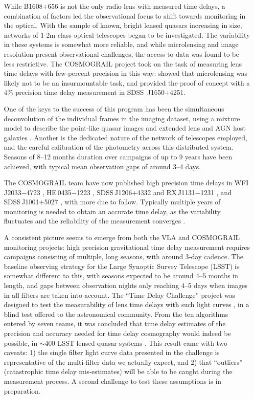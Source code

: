 While B1608$+$656 is not the only radio lens with measured time delays,
a combination of factors  led the observational focus to shift towards
monitoring in the optical. With the sample of known, bright lensed
quasars increasing in size,  networks of 1-2m class optical telescopes
began to be investigated. The variability in these systems is somewhat
more reliable, and while microlensing  and image resolution present
observational challenges, the access to data was found to be less
restrictive. The COSMOGRAIL project took on the task of measuring lens
time delays with few-percent precision in this way:  \citet{Eig++05}
showed that microlensing was likely not to be an insurmountable task,
and \citet{Vui++05} provided the proof of  concept with a 4\% precision
time delay measurement in SDSS\ J1650$+$4251.

One of the keys to the success of this program has been the simultaneous
deconvolution of the individual frames in the imaging dataset, using  a
mixture model to describe the point-like quasar images and extended lens
and AGN host galaxies \citep{MCS98}.  Another is the dedicated nature of
the network of telescopes employed, and the  careful calibration of the
photometry across this distributed system. Seasons of 8--12 months
duration over campaigns of up to 9 years have been achieved, with
typical mean observation gaps of around 3--4 days.

The COSMOGRAIL team have now published high precision time delays in
WFI\,J2033$-$4723 \citep[][3.8\%]{Vui++08}, HE\,0435$-$1223
\citep[][5.6\%]{Cou++11}, SDSS\,J1206$+$4332 \citep[][2.7\%]{Eul++13}
and  RX\,J1131$-$1231 \citep[][1.5\%]{Tew++13}, and SDSS\,J1001$+$5027
\citep[][2.8\%]{RK++13}, with more due to follow.  Typically multiple
years of monitoring is needed to obtain an accurate  time delay, as the
variability fluctuates and the reliability of the  measurement converges
\citep[see the discussion in e.g.\ ][]{Tew++13}.

A consistent picture seems to emerge from both the VLA and COSMOGRAIL
monitoring projects: high precision gravitational time delay
measurement requires campaigns consisting of multiple, long seasons,
with around 3-day cadence. The baseline observing strategy for the
Large Synoptic Survey Telescope (LSST) is somewhat different to this,
with seasons expected to be around 4--5 months in length, and gaps
between observation nights only reaching 4--5 days when images in all
filters are taken into account. The ``Time Delay Challenge'' project
was designed to test the measurability of lens time delays with such
light curves \citep{DoblerEtal2015}, in a blind test offered to the
astronomical community. From the ten algorithms entered by seven
teams, it was concluded that time delay estimates of the precision and
accuracy needed for time delay cosmography would indeed be possible,
in $\sim$400 LSST lensed quasar systems \citep{LiaoEtal2015}. This
result came with two caveats: 1) the single filter light curve data
presented in the challenge is representative of the multi-filter data
we actually expect, and 2) that ``outliers'' (catastrophic time delay
mis-estimates) will be able to be caught during the measurement
process.  A second challenge to test these assumptions is in
preparation.



